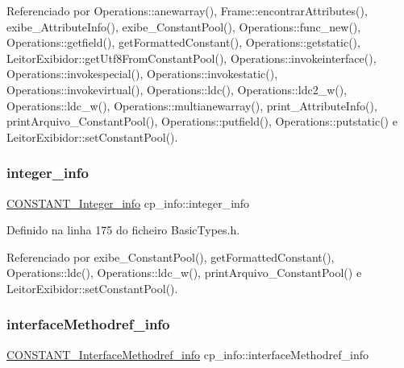 Referenciado por Operations\+::anewarray(), Frame\+::encontrar\+Attributes(), exibe\+\_\+\+Attribute\+Info(), exibe\+\_\+\+Constant\+Pool(), Operations\+::func\+\_\+new(), Operations\+::getfield(), get\+Formatted\+Constant(), Operations\+::getstatic(), Leitor\+Exibidor\+::get\+Utf8\+From\+Constant\+Pool(), Operations\+::invokeinterface(), Operations\+::invokespecial(), Operations\+::invokestatic(), Operations\+::invokevirtual(), Operations\+::ldc(), Operations\+::ldc2\+\_\+w(), Operations\+::ldc\+\_\+w(), Operations\+::multianewarray(), print\+\_\+\+Attribute\+Info(), print\+Arquivo\+\_\+\+Constant\+Pool(), Operations\+::putfield(), Operations\+::putstatic() e Leitor\+Exibidor\+::set\+Constant\+Pool().

\mbox{\label{structcp__info_a134087258f855dca61e8e8922665d050}} 
\subsubsection{\texorpdfstring{integer\+\_\+info}{integer\_info}}
{\footnotesize\ttfamily \hyperlink{structCONSTANT__Integer__info}{C\+O\+N\+S\+T\+A\+N\+T\+\_\+\+Integer\+\_\+info} cp\+\_\+info\+::integer\+\_\+info}



Definido na linha 175 do ficheiro Basic\+Types.\+h.



Referenciado por exibe\+\_\+\+Constant\+Pool(), get\+Formatted\+Constant(), Operations\+::ldc(), Operations\+::ldc\+\_\+w(), print\+Arquivo\+\_\+\+Constant\+Pool() e Leitor\+Exibidor\+::set\+Constant\+Pool().

\mbox{\label{structcp__info_aaebedef650f8f22c5f66057bf1b1271a}} 
\subsubsection{\texorpdfstring{interface\+Methodref\+\_\+info}{interfaceMethodref\_info}}
{\footnotesize\ttfamily \hyperlink{structCONSTANT__InterfaceMethodref__info}{C\+O\+N\+S\+T\+A\+N\+T\+\_\+\+Interface\+Methodref\+\_\+info} cp\+\_\+info\+::interface\+Methodref\+\_\+info}



